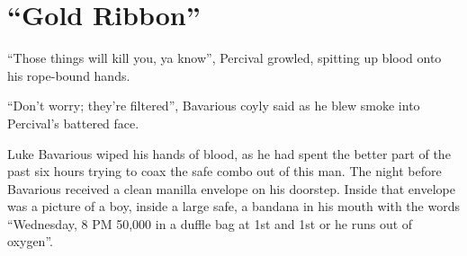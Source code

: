 %
%
%
%
%
%
%
% 
%
%
%
%
%
% 
%
%
%
%
%
%
%
%
%
%
% 
%
%
%
%
%
%
%
%
%
%
%
% 
%
%
%
%
%
%
%
% 
%
%
%
%
%
% 
%
%
%
%
%
% 
%
%
%
%
%
%
%
%
%
%
% 
%
%
%
%
%
%
%
%
%
%
%
% 
%
%
%


\chapter{ ``Gold Ribbon''}



``Those things will kill you, ya know'', Percival
growled, spitting up blood onto his rope-bound hands.

``Don't worry; they're filtered'', Bavarious
coyly said as he blew smoke into Percival's battered
face.

Luke Bavarious wiped his hands of blood, as he had spent the better
part of the past six hours trying to coax the safe combo out of
this man. The night before Bavarious received a clean manilla
envelope on his doorstep. Inside that envelope was a picture of a
boy, inside a large safe, a bandana in his mouth with the words
``Wednesday, 8 PM 50,000 in a duffle bag at 1st and 1st or he
runs out of oxygen''.



